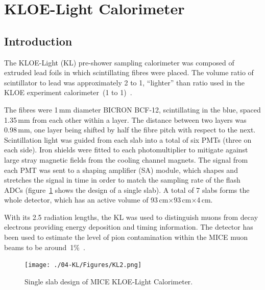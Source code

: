 \graphicspath{{04-KL/Figures/}}

\section{KLOE-Light Calorimeter}
\label{Sect:KL}

\subsection{Introduction}
\label{SubSect:KL_Intro}

The KLOE-Light (KL) pre-shower sampling calorimeter was composed of extruded lead foils in which scintillating fibres were placed. The volume ratio of scintillator to lead was approximately 2 to 1, ``lighter'' than ratio used in the KLOE experiment calorimeter~(1 to 1)~\cite{Ambrosino:2009zza}.

The fibres were 1\,mm diameter BICRON BCF-12, scintillating in the blue, spaced 1.35\,mm from each other within a layer. The distance between two layers was 0.98\,mm, one layer being shifted by half the fibre pitch with respect to the next.
Scintillation light was guided from each slab into a total of six PMTs (three on each side). Iron shields were fitted to each photomultiplier to
mitigate against large stray magnetic fields from the cooling channel magnets. The signal from each PMT was sent to a shaping amplifier (SA) module, which shapes and stretches the signal in time in order to match the sampling rate of the flash ADCs (figure~\ref{fig:KL2} shows the design of a single slab).
A total of 7 slabs forms the whole detector, which has an active volume of 93\,cm$\times$93\,cm$\times$4\,cm.

With its 2.5 radiation lengths, the KL was used to distinguish muons from decay electrons providing energy deposition and timing information.
The detector has been used to estimate the level of pion contamination within the MICE muon beams to be around~1\%~\cite{2016JInst..11P3001A}.
\begin{figure}[htb!]
  \begin{center}
    \texttt{[image: ./04-KL/Figures/KL2.png]}
    \caption{Single slab design of MICE KLOE-Light Calorimeter.}
    \label{fig:KL2}
  \end{center}
\end{figure}



